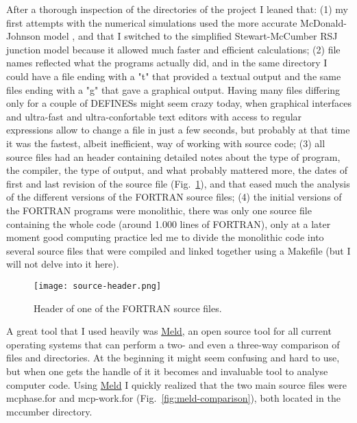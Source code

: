 After a thorough inspection of the directories of the project I leaned that: (1) my first attempts with the numerical simulations used the more accurate McDonald-Johnson model \cite{McDonald:1976}, and that I switched to the simplified Stewart-McCumber RSJ junction model \cite{McCumber:1968, Stewart:1974} because it allowed much faster and efficient calculations; (2) file names reflected what the programs actually did, and in the same directory I could have a file ending with a "t" that provided a textual output and the same files ending with a "g" that gave a graphical output. Having many files differing only for a couple of \textsf{DEFINES}s might seem crazy today, when graphical interfaces and ultra-fast and ultra-confortable text editors with access to regular expressions allow to change a file in just a few seconds, but probably at that time it was the fastest, albeit inefficient, way of working with source code; (3) all source files had an header containing detailed notes about the type of program, the compiler, the type of output, and what probably mattered more, the dates of first and last revision of the source file (Fig.~\ref{fig:source-header}), and that eased much the analysis of the different versions of the FORTRAN source files; (4) the initial versions of the FORTRAN programs were monolithic, there was only one source file containing the whole code (around 1.000 lines of FORTRAN), only at a later moment good computing practice led me to divide the monolithic code into several source files that were compiled and linked together using a \textsf{Makefile} (but I will not delve into it here).

\begin{figure}[tb]
	\centering
	\texttt{[image: source-header.png]}
	\caption{Header of one of the FORTRAN source files.}
	\label{fig:source-header}
\end{figure}


A great tool that I used heavily was \href{http://meldmerge.org/}{Meld}, an open source tool for all current operating systems that can perform a two- and even a three-way comparison of files and directories. At the beginning it might seem confusing and hard to use, but when one gets the handle of it it becomes and invaluable tool to analyse computer code. Using \href{http://meldmerge.org/}{Meld} I quickly realized that the two main source files were \textsf{mcphase.for} and \textsf{mcp-work.for} (Fig.~\ref{fig:meld-comparison}), both located in the \textsf{mccumber} directory.

